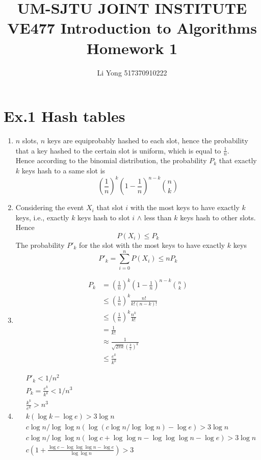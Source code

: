 \documentclass[a4paper]{article}
\title{UM-SJTU JOINT INSTITUTE\\VE477 Introduction to Algorithms\\\vspace{0.5cm} Homework 1}
\author{Li Yong 517370910222}
\begin{document}
\maketitle
\newpage

\section*{Ex.1 Hash tables}
	\begin{enumerate}[1.]
		\item $n$ slots, $n$ keys are equiprobably hashed to each slot, hence the probability that a key hashed to the certain slot is uniform, which is equal to $\frac{1}{n}$.\\
		Hence according to the binomial distribution, the probability $P_k$ that exactly $k$ keys hash to a same slot is
		$$\left(\frac{1}{n}\right)^k\left(1-\frac{1}{n}\right)^{n-k}\binom{n}{k}$$
		\item Considering the event $X_i$ that slot $i$ with the most keys to have exactly $k$ keys, i.e., exactly $k$ keys hash to slot $i$ $\wedge$ less than $k$ keys hash to other slots. Hence
		$$P(X_i)\leq P_k$$
		The probability $P'_k$ for the slot with the most keys to have exactly $k$ keys
		$$P'_k=\sum^n_{i=0} P(X_i)\leq nP_k$$
		\item \begin{align*}
		P_k&=\left(\frac{1}{n}\right)^k\left(1-\frac{1}{n}\right)^{n-k}\binom{n}{k}\\
		&\leq\left(\frac{1}{n}\right)^k\frac{n!}{k!(n-k)!}\\
		&\leq\left(\frac{1}{n}\right)^k\frac{n^k}{k!}\\
		&=\frac{1}{k!}\\
		&\approx \frac{1}{\sqrt{2\pi k}(\frac{k}{e})^k}\\
		&\leq \frac{e^k}{k^k}
		\end{align*}
		\item \begin{align*}
		&P'_k < 1/n^2\\
		&P_k = \frac{e^k}{k^k} < 1/n^3\\
		&\frac{k^k}{e^k} > n^3\\
		&k(\log{k}-\log{e}) > 3\log{n}\\
		&c\log{n}/\log{\log{n}}(\log({c\log{n}/\log{\log{n}}})-\log{e}) > 3\log{n}\\
		&c\log{n}/\log{\log{n}}(\log{c}+\log{\log{n}}-\log{\log{\log{n}}}-\log{e}) > 3\log{n}\\
		&c(1+\frac{\log{c}-\log{\log{\log{n}}}-\log{e}}{\log{\log{n}}}) > 3\\

\end{align*}
\end{enumerate}
\end{document}
